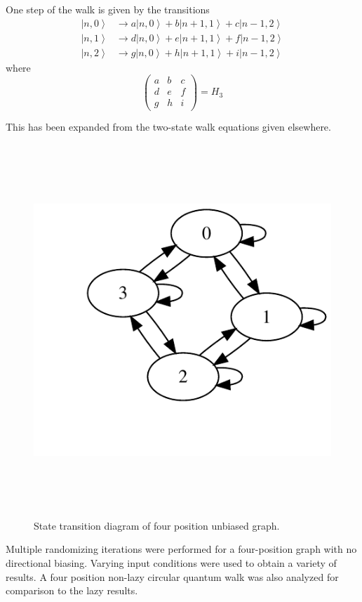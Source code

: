 \documentclass[a0,portrait]{a0poster}
\newcommand{\ket}[1]{\left| #1\right\rangle}
\begin{document}
\begin{center}
{One step of the walk is given by the transitions
\begin{eqnarray}
\ket{n,0} &\longrightarrow a\ket{n,0} + b\ket{n+1,1} + c\ket{n-1,2}\\
\ket{n,1} &\longrightarrow d\ket{n,0} + e\ket{n+1,1} + f\ket{n-1,2}\\
\ket{n,2} &\longrightarrow g\ket{n,0} + h\ket{n+1,1} + i\ket{n-1,2}
\end{eqnarray} 
where 
\begin{equation}
\begin{pmatrix}
  a & b & c \\
  d & e & f \\
  g & h & i 
\end{pmatrix} = H_3
\end{equation}

This has been expanded from the two-state walk equations given elsewhere\cite{Ke:2003,Mc:2010}.

\begin{figure}
\includegraphics[height=140mm]{std-1.pdf}
\caption{State transition diagram of four position unbiased graph.}
\label{std_10k}
\end{figure}    

Multiple randomizing iterations were performed for a four-position graph with no directional biasing.   Varying input conditions were used to obtain a variety of results. A four position non-lazy circular quantum walk was also analyzed for comparison to the lazy results.
}
\col{
}
\end{center}
\end{document}

